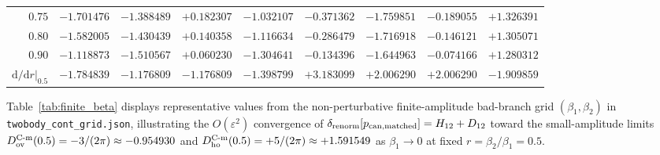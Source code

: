 \documentclass[11pt,a4paper]{article}
\newcommand{\script}[1]{\texttt{#1}}
\newcommand{\dd}{\mathrm{d}}
\begin{document}
\begin{table}[htbp]
\begin{tabular}{@{}rrrrrrrrr@{}}
$0.75$ & $-1.701476$ & $-1.388489$ & $+0.182307$ & $-1.032107$ & $-0.371362$ & $-1.759851$ & $-0.189055$ & $+1.326391$ \\
$0.80$ & $-1.582005$ & $-1.430439$ & $+0.140358$ & $-1.116634$ & $-0.286479$ & $-1.716918$ & $-0.146121$ & $+1.305071$ \\
$0.90$ & $-1.118873$ & $-1.510567$ & $+0.060230$ & $-1.304641$ & $-0.134396$ & $-1.644963$ & $-0.074166$ & $+1.280312$ \\
\midrule
$\dd/\dd r|_{0.5}$ & $-1.784839$ & $-1.176809$ & $-1.176809$ & $-1.398799$ & $+3.183099$ & $+2.006290$ & $+2.006290$ & $-1.909859$ \\
\bottomrule
\end{tabular}
\end{table}

Table~\ref{tab:finite_beta} displays representative values from the non-perturbative finite-amplitude bad-branch grid $(\beta_1,\beta_2)$ in \script{twobody\_cont\_grid.json}, illustrating the $O(\varepsilon^2)$ convergence of $\delta_{\rm renorm}[p_{\rm can,matched}]=H_{12}+D_{12}$ toward the small-amplitude limits $D_{\rm ov}^{\rm C\text{-m}}(0.5)=-3/(2\pi)\approx -0.954930$ and $D_{\rm ho}^{\rm C\text{-m}}(0.5)=+5/(2\pi)\approx +1.591549$ as $\beta_1\to 0$ at fixed $r=\beta_2/\beta_1=0.5$.
\end{document}
